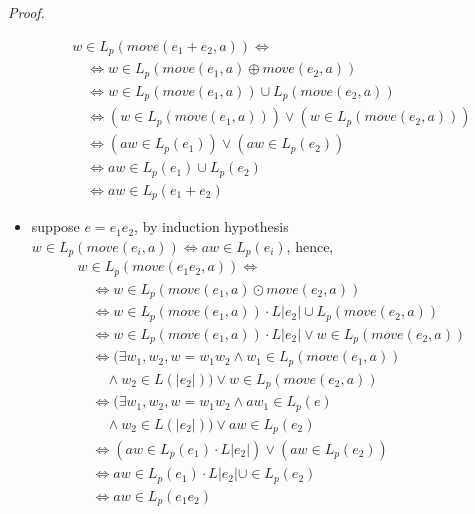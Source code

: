 \documentclass[preprint]{sigplanconf}
\newcommand{\Le}[1]{L(#1)}
\newcommand{\Lp}[1]{L_p(#1)}
\newcounter{item}
\newenvironment{proof}{\begin{trivlist}\item[]{\em Proof.}}{\end{trivlist}}
\begin{document}
\begin{proof}
\begin{itemize}
\[
\begin{array}{l}
w \in \Lp{move(e_1 + e_2,a)} \Leftrightarrow\\ 
\quad \Leftrightarrow w \in \Lp{move(e_1,a) \oplus move(e_2,a)} \\
\quad \Leftrightarrow w \in \Lp{move(e_1,a)} \cup \Lp{move(e_2,a)} \\
\quad \Leftrightarrow (w \in \Lp{move(e_1,a)}) \vee (w \in \Lp{move(e_2,a)}) \\
\quad \Leftrightarrow (aw \in \Lp{e_1}) \vee (aw \in \Lp{e_2}) \\
\quad \Leftrightarrow aw \in \Lp{e_1} \cup \Lp{e_2} \\
\quad \Leftrightarrow aw \in \Lp{e_1+e_2}
\end{array}
\]
\item suppose $e = e_1e_2$,
by induction hypothesis
$w \in \Lp{move(e_i,a)} \Leftrightarrow aw \in \Lp{e_i}$,
hence, 
\[
\begin{array}{l}
w \in \Lp{move(e_1e_2,a)} \Leftrightarrow\\ 
\quad \Leftrightarrow w \in \Lp{move(e_1,a) \odot move(e_2,a)} \\
\quad \Leftrightarrow w \in \Lp{move(e_1,a)} \cdot L|e_2| \cup \Lp{move(e_2,a)} \\
\quad \Leftrightarrow w \in \Lp{move(e_1,a)} \cdot L|e_2| \vee w \in \Lp{move(e_2,a)} \\
\quad \Leftrightarrow (\exists w_1,w_2, w=w_1w_2 \wedge w_1 \in \Lp{move(e_1,a)}\\ 
\quad\quad \wedge w_2 \in \Le{|e_2|}) \vee w \in \Lp{move(e_2,a)}\\
\quad \Leftrightarrow (\exists w_1,w_2, w=w_1w_2 \wedge aw_1 \in \Lp{e}\\ 
\quad\quad \wedge w_2 \in \Le{|e_2|}) \vee aw \in \Lp{e_2}\\
\quad \Leftrightarrow (aw \in \Lp{e_1} \cdot L|e_2|) \vee (aw \in \Lp{e_2}) \\
\quad \Leftrightarrow aw \in \Lp{e_1} \cdot L|e_2| \cup \in \Lp{e_2} \\
\quad \Leftrightarrow aw \in \Lp{e_1e_2} \\

\end{array}
\]


\end{itemize}
\end{proof}
\end{document}
